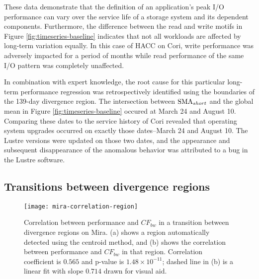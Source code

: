 These data demonstrate that the definition of an application's peak I/O performance can vary over the service life of a storage system and its dependent components.
Furthermore, the difference between the read and write motifs in Figure \ref{fig:timeseries-baseline} indicates that not all workloads are affected by long-term variation equally. 
In this case of HACC on Cori, write performance was adversely impacted for a period of months while read performance of the same I/O pattern was completely unaffected.

In combination with expert knowledge, the root cause for this particular long-term performance regression was retrospectively identified using the boundaries of the 139-day divergence region.
The intersection between $\textup{SMA}_{short}$ and the global mean in Figure \ref{fig:timeseries-baseline} occured at March 24 and August 10.
Comparing these dates to the service history of Cori revealed that operating system upgrades occurred on exactly those dates--March 24 and August 10.
The Lustre versions were updated on those two dates, and the appearance and subsequent disappearance of the anomalous behavior was attributed to a bug in the Lustre software.







\subsection{Transitions between divergence regions} \label{sec:results/transitions}

\begin{figure}
    \centering
    \texttt{[image: mira-correlation-region]}
    \vspace{-.35in}
    \caption{Correlation between performance and $CF_{bw}$ in a transition between divergence regions on Mira. (a) shows a region automatically detected using the centroid method, and (b) shows the correlation between performance and $CF_{bw}$ in that region.  Correlation coefficient is $0.565$ and p-value is ${1.48 \times 10^{-11}}$; dashed line in (b) is a linear fit with slope $0.714$ drawn for visual aid.}
    \label{fig:mira-correlation-region}
\end{figure}

